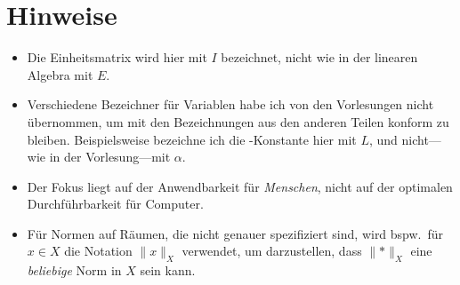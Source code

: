 \chapter{Hinweise}
\begin{itemize}
  \item Die Einheitsmatrix wird hier mit $I$ bezeichnet, nicht wie in der linearen Algebra mit $E$.
  \item Verschiedene Bezeichner für Variablen habe ich von den Vorlesungen nicht übernommen, um mit den Bezeichnungen aus den anderen Teilen konform zu bleiben.
  	Beispielsweise bezeichne ich die -Konstante hier mit $L$, und nicht---wie in der Vorlesung---mit $\alpha$.
  \item Der Fokus liegt auf der Anwendbarkeit für \emph{Menschen}, nicht auf der optimalen Durchführbarkeit für Computer.
  \item Für Normen auf Räumen, die nicht genauer spezifiziert sind, wird bspw.~für $x\in X$ die Notation $\lVert x \rVert_X$ verwendet, um darzustellen, dass $\lVert * \rVert_X$ eine \emph{beliebige} Norm in $X$ sein kann.
\end{itemize}

